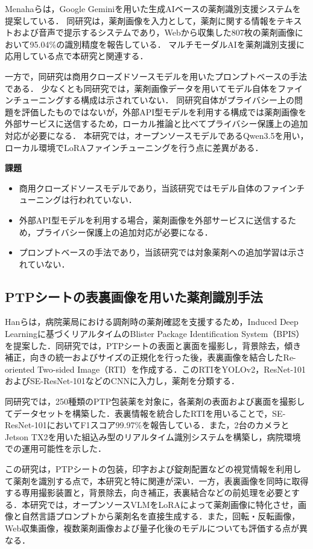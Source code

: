 \documentclass[dvipdfmx]{jsarticle}
\begin{document}
Menahaら\cite{gemini2024pill}は，Google Geminiを用いた生成AIベースの薬剤識別支援システムを提案している．
同研究は，薬剤画像を入力として，薬剤に関する情報をテキストおよび音声で提示するシステムであり，Webから収集した807枚の薬剤画像において95.04\%の識別精度を報告している．
マルチモーダルAIを薬剤識別支援に応用している点で本研究と関連する．

一方で，同研究は商用クローズドソースモデルを用いたプロンプトベースの手法である．
少なくとも同研究では，薬剤画像データを用いてモデル自体をファインチューニングする構成は示されていない．
同研究自体がプライバシー上の問題を評価したものではないが，外部API型モデルを利用する構成では薬剤画像を外部サービスに送信するため，ローカル推論と比べてプライバシー保護上の追加対応が必要になる．
本研究では，オープンソースモデルであるQwen3.5を用い，ローカル環境でLoRAファインチューニングを行う点に差異がある．

\textbf{課題}
\begin{itemize}
  \item 商用クローズドソースモデルであり，当該研究ではモデル自体のファインチューニングは行われていない．
  \item 外部API型モデルを利用する場合，薬剤画像を外部サービスに送信するため，プライバシー保護上の追加対応が必要になる．
  \item プロンプトベースの手法であり，当該研究では対象薬剤への追加学習は示されていない．
\end{itemize}

\subsection{PTPシートの表裏画像を用いた薬剤識別手法}

Hanら\cite{han2021bpis}は，病院薬局における調剤時の薬剤確認を支援するため，Induced Deep Learningに基づくリアルタイムのBlister Package Identification System（BPIS）を提案した．同研究では，PTPシートの表面と裏面を撮影し，背景除去，傾き補正，向きの統一およびサイズの正規化を行った後，表裏画像を結合したRe-oriented Two-sided Image（RTI）を作成する．このRTIをYOLOv2，ResNet-101およびSE-ResNet-101などのCNNに入力し，薬剤を分類する．

同研究では，250種類のPTP包装薬を対象に，各薬剤の表面および裏面を撮影してデータセットを構築した．表裏情報を統合したRTIを用いることで，SE-ResNet-101においてF1スコア99.97\%を報告している．また，2台のカメラとJetson TX2を用いた組込み型のリアルタイム識別システムを構築し，病院環境での運用可能性を示した．

この研究は，PTPシートの包装，印字および錠剤配置などの視覚情報を利用して薬剤を識別する点で，本研究と特に関連が深い．一方，表裏画像を同時に取得する専用撮影装置と，背景除去，向き補正，表裏結合などの前処理を必要とする．本研究では，オープンソースVLMをLoRAによって薬剤画像に特化させ，画像と自然言語プロンプトから薬剤名を直接生成する．また，回転・反転画像，Web収集画像，複数薬剤画像および量子化後のモデルについても評価する点が異なる．
\end{document}
